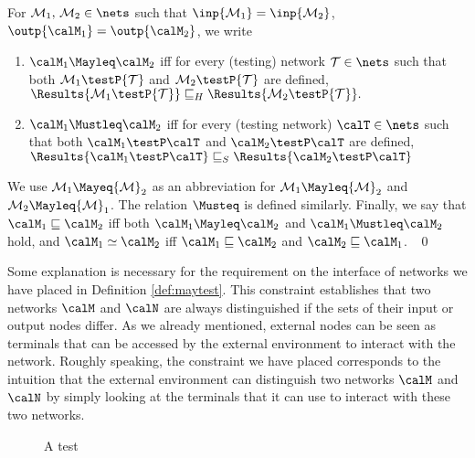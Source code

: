 \documentclass{LMCS}
\begin{document}
\begin{defi}
\label{def:maytest}
 For ${\mathcal M}_1,\,{\mathcal M}_2 \in \nets$ 
  such that
  $\inp{{\mathcal M}_1} = \inp{{\mathcal M}_2}$, 
  $\outp{\calM_1} = \outp{\calM_2}$, we write 
  \begin{enumerate}
  
  \item $\calM_1 \Mayleq \calM_2$ iff 
for every (testing) network $\mathcal T \in \nets$ such that both 
        ${\mathcal M}_1 \testP {\mathcal T}$ and  ${\mathcal M}_2 \testP {\mathcal T}$ are defined,
        \begin{math}
           \Results{{\mathcal M}_1 \testP {\mathcal T}}     \sqsubseteq_{H} \Results{{\mathcal M}_2 \testP {\mathcal T} }.   
        \end{math} 
  \item $\calM_1 \Mustleq \calM_2$ iff for every (testing network) $\calT \in \nets$ such that 
  both $\calM_1 \testP \calT$ and $\calM_2 \testP \calT$ are defined, 
  \begin{math}
  \Results{\calM_1 \testP \calT} \sqsubseteq_{S} \Results{\calM_2 \testP \calT}
  \end{math}
  \end{enumerate}
We use ${\mathcal M}_1 \Mayeq {\mathcal M}_2$ as an abbreviation for ${\mathcal M}_1 \Mayleq {\mathcal M}_2$  and 
${\mathcal M}_2 \Mayleq {\mathcal M}_1$. The relation $\Musteq$ is defined similarly. 
Finally, we say that $\calM_1 \sqsubseteq \calM_2$ iff both $\calM_1 \Mayleq \calM_2$ and 
$\calM_1 \Mustleq \calM_2$ hold, and $\calM_1 \simeq \calM_2$ iff $\calM_1 \sqsubseteq \calM_2$ 
and $\calM_2 \sqsubseteq \calM_1$.
~\qed
\end{defi}

Some explanation is necessary for the requirement on the interface of networks we have 
placed in Definition \ref{def:maytest}. 
This constraint establishes that two networks $\calM$ and $\calN$ are always distinguished 
if the sets of their input or output nodes differ. As we already mentioned, external nodes 
can be seen as terminals that can be accessed by the external environment to interact with 
the network. Roughly speaking, the constraint we have placed corresponds to the intuition 
that the external environment can distinguish two networks 
$\calM$ and $\calN$ by simply looking at the terminals that it can use to interact with these 
two networks. 



\begin{figure}

\caption{ A test} 
\label{fig:testex}
\end{figure}
\end{document}
